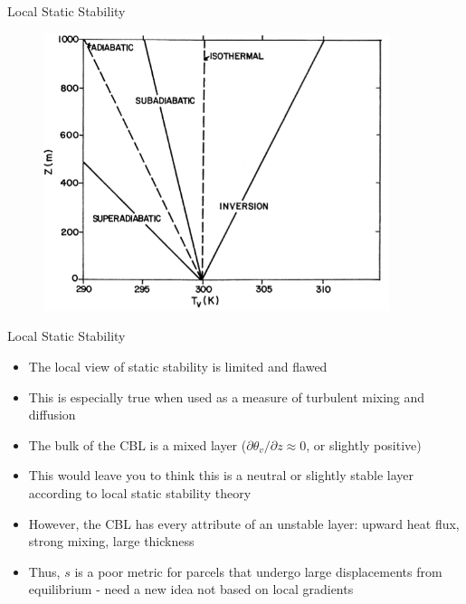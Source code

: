\begin{frame}{Local Static Stability}
\begin{figure}
	\includegraphics[width=0.9\textwidth]{fig9}
\end{figure}
\end{frame}
\begin{frame}{Local Static Stability}

\begin{itemize}
	\item The local view of static stability is limited and flawed
	\item This is especially true when used as a measure of turbulent mixing and diffusion
	\item The bulk of the CBL is a mixed layer ($\partial \theta_v /\partial z \approx 0$, or slightly positive)
	\item This would leave you to think this is a neutral or slightly stable layer according to local static stability theory
	\item However, the CBL has every attribute of an unstable layer: upward heat flux, strong mixing, large thickness
	\item Thus, $s$ is a poor metric for parcels that undergo large displacements from equilibrium - need a new idea not based on local gradients 
\end{itemize}
\end{frame}
